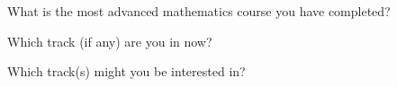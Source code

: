 \documentclass[handout,nooutcomes,space]{ximera}
\begin{document}
\newpage 

\begin{question}
What is the most advanced mathematics course you have completed?    
\begin{freeResponse}
\end{freeResponse}
\end{question}

\begin{question}
Which track (if any) are you in now?  
\begin{freeResponse}
\end{freeResponse}
\end{question}

\begin{question}
Which track(s) might you be interested in? 
\begin{freeResponse}
\end{freeResponse}
\end{question}
\end{document}

